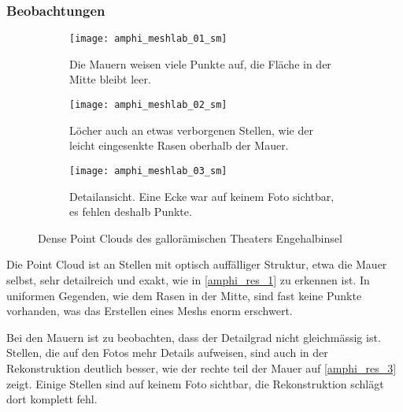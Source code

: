 			\subsubsection{Beobachtungen}
				\begin{figure}
					\vspace*{-5cm}
					\begin{subfigure}{\textwidth}
						\texttt{[image: amphi\_meshlab\_01\_sm]}
						\caption{Die Mauern weisen viele Punkte auf, die Fläche in der Mitte bleibt leer.}
						\label{amphi_res_1}
					\end{subfigure}
					\begin{subfigure}{\textwidth}
						\vspace*{-1cm}
						\texttt{[image: amphi\_meshlab\_02\_sm]}
						\vspace*{-1cm}
						\caption{Löcher auch an etwas verborgenen Stellen, wie der leicht eingesenkte Rasen oberhalb der Mauer.}
						\label{amphi_res_2}
					\end{subfigure}
					\begin{subfigure}{\textwidth}
						\vspace*{-1cm}
						\texttt{[image: amphi\_meshlab\_03\_sm]}
						\caption{Detailansicht. Eine Ecke war auf keinem Foto sichtbar, es fehlen deshalb Punkte.}
						\label{amphi_res_3}
					\end{subfigure}
					\caption{Dense Point Clouds des gallorämischen Theaters Engehalbinsel}
					\label{amphi_res}
				\end{figure}
				Die Point Cloud ist an Stellen mit optisch auffälliger Struktur, etwa die Mauer selbst, sehr detailreich und exakt, wie in \autoref{amphi_res_1} zu erkennen ist. In uniformen Gegenden, wie dem Rasen in der Mitte, sind fast keine Punkte vorhanden, was das Erstellen eines Meshs enorm erschwert.
								
				Bei den Mauern ist zu beobachten, dass der Detailgrad nicht gleichmässig ist. Stellen, die auf den Fotos mehr Details aufweisen, sind auch in der Rekonstruktion deutlich besser, wie der rechte teil der Mauer auf \autoref{amphi_res_3} zeigt.
				Einige Stellen sind auf keinem Foto sichtbar, die Rekonstruktion schlägt dort komplett fehl.
				

